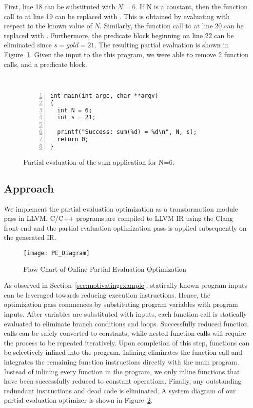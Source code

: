 First, line 18 can be substituted with $N = 6$.
If N is a constant, then the function call to  at line 19 can be replaced with .
This is obtained by evaluating  with respect to the known value of $N$. 
Similarly, the function call to  at line 20 can be replaced with .
Furthermore, the predicate block beginning on line 22 can be eliminated since $s = gold = 21$.
The resulting partial evaluation is shown in Figure~\ref{fig:pe_sum}.
Given the input to the this program, we were able to remove 2 function calls, and a predicate block.

\begin{figure}[htbp]\
\begin{Verbatim}[frame=single,fontsize={\scriptsize},numbers=left,numbersep=5pt,xleftmargin=10pt]
int main(int argc, char **argv)
{
  int N = 6;
  int s = 21;

  printf("Success: sum(%d) = %d\n", N, s);
  return 0;
}
\end{Verbatim}
\caption{Partial evaluation of the sum application for N=6.}
\label{fig:pe_sum}
\end{figure}

\subsection{Approach}

We implement the partial evaluation optimization as a transformation module pass in LLVM.
C/C++ programs are compiled to LLVM IR using the Clang front-end and the partial evaluation optimization pass is applied subsequently on the generated IR.

\begin{figure}[htbp]
  \centering
  \texttt{[image: PE\_Diagram]}
  \caption{Flow Chart of Online Partial Evaluation Optimization}
  \label{fig:pe_diagram}
\end{figure}

As observed in Section~\ref{sec:motivatingexample}, statically known program inputs can be leveraged towards reducing execution instructions. 
Hence, the optimization pass commences by substituting program variables with program inputs.
After variables are substituted with inputs, each function call is statically evaluated to eliminate branch conditions and loops.
Successfully reduced function calls can be safely converted to constants, while nested function calls will require the process to be repeated iteratively. 
Upon completion of this step, functions can be selectively inlined into the program.
Inlining eliminates the function call and integrates the remaining function instructions directly with the main program.
Instead of inlining every function in the program, we only inline functions that have been successfully reduced to constant operations.
Finally, any outstanding redundant instructions and dead code is eliminated.
A system diagram of our partial evaluation optimizer is shown in Figure~\ref{fig:pe_diagram}.


